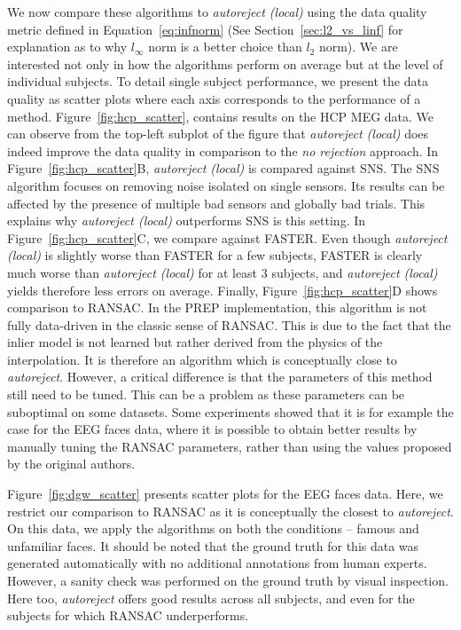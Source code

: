 We now compare these algorithms to \emph{autoreject (local)} using the data quality metric defined in Equation~\eqref{eq:infnorm} (See Section~\ref{sec:l2_vs_linf} for explanation as to why $l_\infty$ norm is a better choice than $l_2$ norm). 
We are interested not only in how the algorithms perform on average but at the level of individual subjects. To detail single subject performance, we present the data quality as scatter plots where each axis corresponds to the performance of a method. Figure~\ref{fig:hcp_scatter}, contains results on the HCP MEG data. We can observe from the top-left subplot of the figure that \emph{autoreject (local)} does indeed improve the data quality in comparison to the \emph{no rejection} approach. In Figure~\ref{fig:hcp_scatter}B, \emph{autoreject (local)} is compared against SNS. The SNS algorithm focuses on removing noise isolated on single sensors. Its results can be affected by the presence of multiple bad sensors and globally bad trials. This explains why \emph{autoreject (local)} outperforms SNS is this setting. In Figure~\ref{fig:hcp_scatter}C, we compare against FASTER. Even though \emph{autoreject (local)} is slightly worse than FASTER for a few subjects, FASTER is clearly much worse than \emph{autoreject (local)} for at least 3 subjects, and \emph{autoreject (local)} yields therefore less errors on average. Finally, Figure~\ref{fig:hcp_scatter}D shows comparison to RANSAC. In the PREP implementation, this algorithm is not fully data-driven in the classic sense of RANSAC. This is due to the fact that the inlier model is not learned but rather derived from the physics of the interpolation. It is therefore an algorithm which is conceptually close to \emph{autoreject}. However, a critical difference is that the parameters of this method still need to be tuned. This can be a problem as these parameters can be suboptimal on some datasets. Some experiments showed that it is for example the case for the EEG faces data, where it is possible to obtain better results by manually tuning the RANSAC parameters, rather than using the values proposed by the original authors.

Figure~\ref{fig:dgw_scatter} presents scatter plots for the EEG faces data.
%
Here, we restrict our comparison to RANSAC as it is conceptually the closest to \emph{autoreject}. On this data, we apply the algorithms on both the conditions -- famous and unfamiliar faces. It should be noted that the ground truth for this data was generated automatically with no additional annotations from human experts. However, a sanity check was performed on the ground truth by visual inspection. Here too, \emph{autoreject} offers good results across all subjects, and even for the subjects for which RANSAC underperforms.

